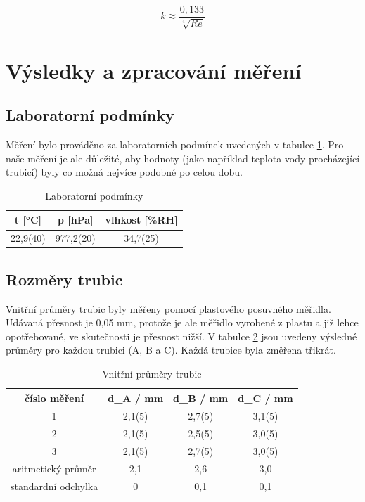     \begin{equation}
        k \approx \frac{0,133}{\sqrt[4]{Re}}
    \end{equation}
\section{Výsledky a zpracování měření}

\subsection{Laboratorní podmínky}

    Měření bylo prováděno za laboratorních podmínek uvedených v tabulce \ref{tab:lab_pod}. Pro naše měření je ale důležité, aby hodnoty (jako například teplota vody procházející  trubicí) byly co možná nejvíce podobné po celou dobu.

    \begin{table}[h]
        \centering
        \caption{Laboratorní podmínky}
        \label{tab:lab_pod}
        \begin{tabular}{|c|c|c|} 
        \hline
            t [°C] & p [hPa] & vlhkost [\%RH]  \\ 
        \hline
            22,9(40)   & 977,2(20)   & 34,7(25)            \\
        \hline
        \end{tabular}
    \end{table}

\subsection{Rozměry trubic}

    Vnitřní průměry trubic byly měřeny pomocí plastového posuvného měřidla. Udávaná přesnost je 0,05 mm, protože je ale měřidlo vyrobené z plastu a již lehce opotřebované, ve skutečnosti je přesnost nižší. V tabulce \ref{tab:prumery} jsou uvedeny výsledné průměry pro každou trubici (A, B a C). Každá trubice byla změřena třikrát.

    \begin{table}[h]
        \centering
        \caption{Vnitřní průměry trubic}
        \label{tab:prumery}
        \begin{tabular}{|c|c|c|c|} 
        \hline
            číslo měření & d_A / mm & d_B / mm & d_C / mm  \\ 
        \hline
            1            & 2,1(5)    & 2,7(5)    & 3,1(5)   \\
            2            & 2,1(5)    & 2,5(5)    & 3,0(5)   \\
            3            & 2,1(5)    & 2,7(5)    & 3,0(5)   \\ 
        \hline
            aritmetický průměr   & 2,1       & 2,6       & 3,0         \\
            standardní odchylka        & 0       & 0,1       & 0,1     \\
        \hline
        \end{tabular}
    \end{table}

